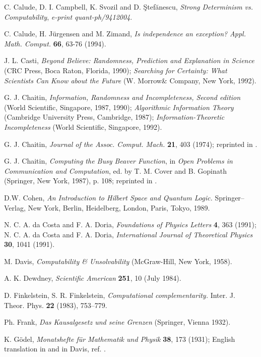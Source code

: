 \begin{thebibliography}{99}
C. Calude,
D. I. Campbell,
 K. Svozil and
D. \c{S}tef\u anescu,
{\sl Strong Determinism vs.  Computability},
{\it  e-print quant-ph/9412004}.

C. Calude,
H. J\"urgensen and M. Zimand,
{\sl Is independence an exception?}
{\sl Appl. Math. Comput.} {\bf 66}, 63-76 (1994).

J. L. Casti,
{\sl Beyond Believe: Randomness, Prediction and Explanation in Science}
(CRC Press, Boca Raton, Florida, 1990);
 {\sl Searching for Certainty: What Scientists Can Know about the
Future}
(W. Morrow\& Company, New York, 1992).


G. J. Chaitin, {\sl Information, Randomness and Incompleteness, Second
edition}
(World Scientific, Singapore, 1987, 1990);
{\sl Algorithmic Information Theory}
(Cambridge University Press, Cambridge, 1987);
{\sl Information-Theoretic Incompleteness}
(World Scientific, Singapore, 1992).

 G. J. Chaitin,
 {\sl Journal of the Assoc. Comput. Mach.} {\bf 21}, 403 (1974);
 reprinted in
 \cite{chaitin}.


 G. J. Chaitin, {\sl Computing the Busy Beaver Function}, in {\sl Open
 Problems in Communication and Computation}, ed. by T. M. Cover and B.
 Gopinath (Springer, New York, 1987), p. 108; reprinted in
 \cite{chaitin}.

 D.W. Cohen, {\it An Introduction to Hilbert Space
and Quantum Logic.} Sprin\-ger--Verlag, New York, Berlin, Heidelberg,
London, Paris, Tokyo, 1989.


 N. C. A. da Costa and F. A. Doria,
 {\sl Foundations of Physics Letters} {\bf 4}, 363 (1991);
 N. C. A. da Costa and F. A. Doria,
 {\sl International Journal of Theoretical Physics} {\bf 30}, 1041
 (1991).



 M. Davis, {\sl Computability \& Unsolvability}
 (McGraw-Hill, New York, 1958).


 A. K. Dewdney, {\sl Scientific American} {\bf 251}, 10 (July 1984).

 D. Finkelstein, S. R. Finkelstein, {\it
Computational
complementarity.} Inter. J. Theor. Phys. {\bf 22} (1983), 753--779.

Ph. Frank, {\sl Das Kausalgesetz und seine Grenzen}
(Springer, Vienna 1932).


K. G\"odel, {\sl Monatshefte f\"ur Mathematik und Physik}
{\bf 38}, 173 (1931);
English translation in \cite{godel-ges1} and in Davis, ref.
 \cite{davis-58}.


\end{thebibliography}
